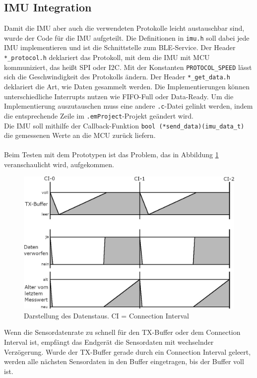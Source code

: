 \subsection{IMU Integration}
Damit die IMU aber auch die verwendeten Protokolle leicht austauschbar sind, wurde der Code für die IMU aufgeteilt.
Die Definitionen in \texttt{imu.h} soll dabei jede IMU implementieren und ist die Schnittstelle zum BLE-Service.
Der Header \texttt{*\_protocol.h} deklariert das Protokoll, mit dem die IMU mit MCU kommuniziert, das heißt SPI oder I2C.
Mit der Konstanten \texttt{PROTOCOL\_SPEED} lässt sich die Geschwindigkeit des Protokolls ändern.
Der Header \texttt{*\_get\_data.h} deklariert die Art, wie Daten gesammelt werden.
Die Implementierungen können unterschiedliche Interrupts nutzen wie FIFO-Full oder Data-Ready.
Um die Implementierung auszutauschen muss eine andere \texttt{.c}-Datei gelinkt werden, indem die entsprechende Zeile im \texttt{.emProject}-Projekt geändert wird.\\
Die IMU soll mithilfe der Callback-Funktion \texttt{bool (*send\_data)(imu\_data\_t)} die gemessenen Werte an die MCU zurück liefern.\\\\
Beim Testen mit dem Prototypen ist das Problem, das in Abbildung \ref{fig:daten_vorher} veranschaulicht wird, aufgekommen.
\begin{figure}[!hbtp]
	\centering
	\includegraphics[width=0.76\linewidth]{res/datenVorher.jpg}
	\caption{Darstellung des Datenstaus. CI = Connection Interval}
	\label{fig:daten_vorher}
\end{figure}
Wenn die Sensordatenrate zu schnell für den TX-Buffer oder dem Connection Interval ist, empfängt das Endgerät die Sensordaten mit wechselnder Verzögerung.
Wurde der TX-Buffer gerade durch ein Connection Interval geleert, werden alle nächsten Sensordaten in den Buffer eingetragen, bis der Buffer voll ist.
